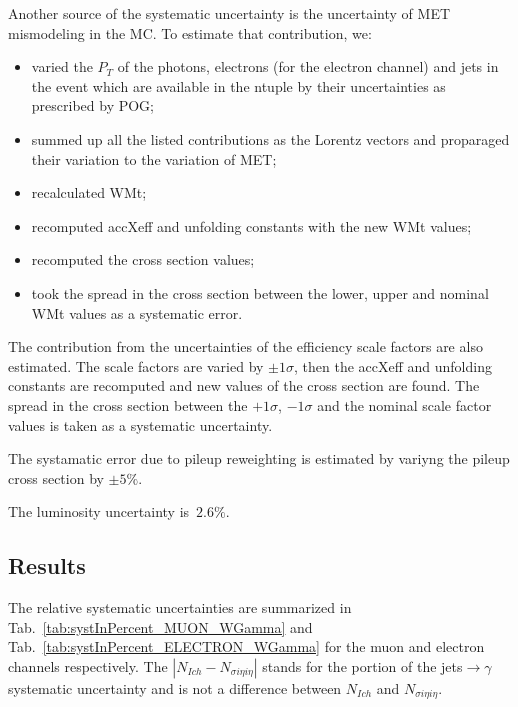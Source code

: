 Another source of the systematic uncertainty is the uncertainty of MET mismodeling in the MC. To estimate that contribution, we:

\begin{itemize}
  \item varied the $P_T$ of the photons, electrons (for the electron channel) and jets in the event which are available in the ntuple by their uncertainties as prescribed by POG;
  \item summed up all the listed contributions as the Lorentz vectors and proparaged their variation to the variation of MET;
  \item recalculated WMt;
  \item recomputed accXeff and unfolding constants with the new WMt values;
  \item recomputed the cross section values;
  \item took the spread in the cross section between the lower, upper and nominal WMt values as a systematic error.
\end{itemize}

The contribution from the uncertainties of the efficiency scale factors are also estimated. The scale factors are varied by $\pm 1\sigma$, then the accXeff and unfolding constants are recomputed and new values of the cross section are found. The spread in the cross section between the $+1\sigma$, $-1\sigma$ and the nominal scale factor values is taken as a systematic uncertainty.


The systamatic error due to pileup reweighting is estimated by variyng the pileup cross section by $\pm5\%$.

The luminosity uncertainty is~$2.6\%$.

\subsection{Results}

The relative systematic uncertainties are summarized in Tab.~\ref{tab:systInPercent_MUON_WGamma} and Tab.~\ref{tab:systInPercent_ELECTRON_WGamma} for the muon and electron channels respectively. The $|N_{Ich}-N_{\sigma{i\eta i\eta}}|$ stands for the portion of the jets$\rightarrow\gamma$ systematic uncertainty and is not a difference between $N_{Ich}$ and $N_{\sigma{i\eta i\eta}}$.

